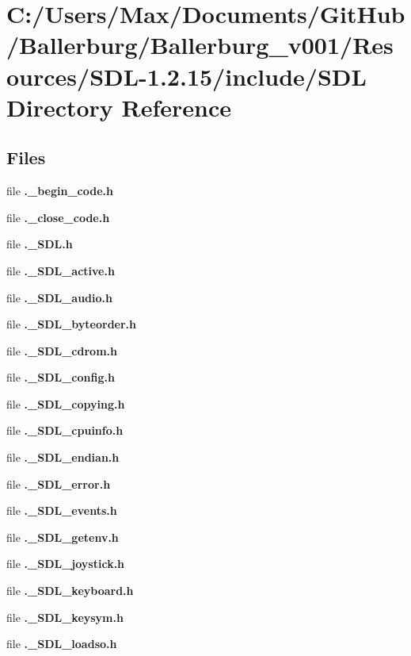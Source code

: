\section{C\+:/\+Users/\+Max/\+Documents/\+Git\+Hub/\+Ballerburg/\+Ballerburg\+\_\+v001/\+Resources/\+S\+D\+L-\/1.2.15/include/\+S\+D\+L Directory Reference}
\label{dir_345acc6b2cf63f3dbc92b73db844cd3b}
\subsection*{Files}
\begin{DoxyCompactItemize}
\item 
file {\bfseries .\+\_\+begin\+\_\+code.\+h}
\item 
file {\bfseries .\+\_\+close\+\_\+code.\+h}
\item 
file {\bfseries .\+\_\+\+S\+D\+L.\+h}
\item 
file {\bfseries .\+\_\+\+S\+D\+L\+\_\+active.\+h}
\item 
file {\bfseries .\+\_\+\+S\+D\+L\+\_\+audio.\+h}
\item 
file {\bfseries .\+\_\+\+S\+D\+L\+\_\+byteorder.\+h}
\item 
file {\bfseries .\+\_\+\+S\+D\+L\+\_\+cdrom.\+h}
\item 
file {\bfseries .\+\_\+\+S\+D\+L\+\_\+config.\+h}
\item 
file {\bfseries .\+\_\+\+S\+D\+L\+\_\+copying.\+h}
\item 
file {\bfseries .\+\_\+\+S\+D\+L\+\_\+cpuinfo.\+h}
\item 
file {\bfseries .\+\_\+\+S\+D\+L\+\_\+endian.\+h}
\item 
file {\bfseries .\+\_\+\+S\+D\+L\+\_\+error.\+h}
\item 
file {\bfseries .\+\_\+\+S\+D\+L\+\_\+events.\+h}
\item 
file {\bfseries .\+\_\+\+S\+D\+L\+\_\+getenv.\+h}
\item 
file {\bfseries .\+\_\+\+S\+D\+L\+\_\+joystick.\+h}
\item 
file {\bfseries .\+\_\+\+S\+D\+L\+\_\+keyboard.\+h}
\item 
file {\bfseries .\+\_\+\+S\+D\+L\+\_\+keysym.\+h}
\item 
file {\bfseries .\+\_\+\+S\+D\+L\+\_\+loadso.\+h}

\end{DoxyCompactItemize}
